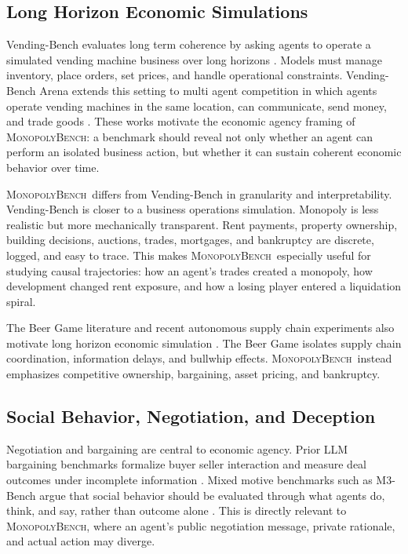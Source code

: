 \documentclass[conference]{IEEEtran}
\newcommand{\Bench}{\textsc{MonopolyBench}}
\begin{document}
\subsection{Long Horizon Economic Simulations}

Vending-Bench evaluates long term coherence by asking agents to operate a simulated vending machine business over long horizons \cite{vendingbench}. Models must manage inventory, place orders, set prices, and handle operational constraints. Vending-Bench Arena extends this setting to multi agent competition in which agents operate vending machines in the same location, can communicate, send money, and trade goods \cite{vendingarena}. These works motivate the economic agency framing of \Bench: a benchmark should reveal not only whether an agent can perform an isolated business action, but whether it can sustain coherent economic behavior over time.

\Bench\ differs from Vending-Bench in granularity and interpretability. Vending-Bench is closer to a business operations simulation. Monopoly is less realistic but more mechanically transparent. Rent payments, property ownership, building decisions, auctions, trades, mortgages, and bankruptcy are discrete, logged, and easy to trace. This makes \Bench\ especially useful for studying causal trajectories: how an agent's trades created a monopoly, how development changed rent exposure, and how a losing player entered a liquidation spiral.

The Beer Game literature and recent autonomous supply chain experiments also motivate long horizon economic simulation \cite{beergame_site,beergame_hbr}. The Beer Game isolates supply chain coordination, information delays, and bullwhip effects. \Bench\ instead emphasizes competitive ownership, bargaining, asset pricing, and bankruptcy.

\subsection{Social Behavior, Negotiation, and Deception}

Negotiation and bargaining are central to economic agency. Prior LLM bargaining benchmarks formalize buyer seller interaction and measure deal outcomes under incomplete information \cite{bargaining}. Mixed motive benchmarks such as M3-Bench argue that social behavior should be evaluated through what agents do, think, and say, rather than outcome alone \cite{m3bench}. This is directly relevant to \Bench, where an agent's public negotiation message, private rationale, and actual action may diverge.
\end{document}
